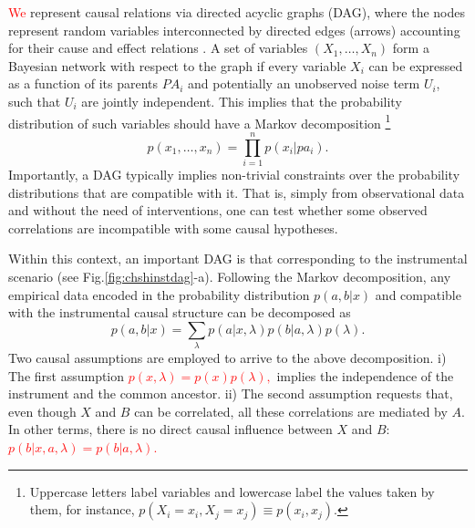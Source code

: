\documentclass[letterpaper]{article}
\begin{document}
\textcolor{red}{We} represent causal relations via directed acyclic graphs
(DAG), where the nodes represent random variables interconnected by directed
edges (arrows) accounting for their cause and effect relations \cite{pearlbook}.
A set of variables  $\left( X_1,\dots, X_n \right)$ form a Bayesian network with
respect to the graph if every variable $X_i$ can be expressed as a function of
its parents $PA_i$ and potentially an unobserved noise term $U_i$, such that
$U_i$ are jointly independent. This implies that the probability distribution of
such variables should have a Markov decomposition 
\footnote{Uppercase letters label variables and lowercase label the values taken
by them, for instance, $p(X_i =x_i, X_j = x_j) \equiv p(x_i, x_j)$.}
\begin{equation}
p(x_1,\dots,x_n)= \prod_{i=1}^{n} p(x_i \vert pa_i).    
\end{equation}
Importantly, a DAG typically implies non-trivial constraints over the
probability distributions that are compatible with it. That is, simply from
observational data and without the need of interventions, one can test whether
some observed correlations are incompatible with some causal hypotheses.

Within this context, an important DAG is that corresponding to the instrumental
scenario (see Fig.\ref{fig:chshinstdag}-a). Following the Markov decomposition, any
empirical data encoded in the probability distribution $p(a,b \vert x)$ and
compatible with the instrumental causal structure can be decomposed as
\begin{equation}
p(a,b \vert x) = \sum_{\lambda} p(a\vert x,\lambda) p(b\vert a,\lambda)p(\lambda).
\end{equation}
Two causal assumptions are employed to arrive to the above decomposition. i) The first assumption
\textcolor{red}{
$
p(x,\lambda)=p(x)p(\lambda), 
$} implies the independence of
the instrument and the common ancestor. ii) The second assumption requests that, even though
$X$ and $B$ can be correlated, all these correlations are mediated by $A$. In
other terms, there is no direct causal influence between $X$ and $B$:
\textcolor{red}{
$
p(b\vert x,a,\lambda)=p(b\vert a,\lambda).
$}
\end{document}
